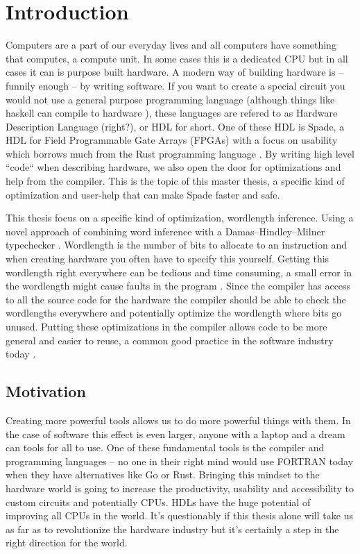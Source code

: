\documentclass[msc,lith,english]{liuthesis}
\author{Edvard Thörnros}
\begin{document}
\chapter{Introduction}
\label{chaIntro}
Computers are a part of our everyday lives and all computers have something that computes, a compute unit. In some cases this is a dedicated CPU but in all cases it can is purpose built hardware. A modern way of building hardware is -- funnily enough -- by writing software. If you want to create a special circuit you would not use a general purpose programming language (although things like haskell can compile to hardware \cite{src:HaskellLib}), these languages are refered to as Hardware Description Language (right?), or HDL for short. One of these HDL is Spade, a HDL for Field Programmable Gate Arrays (FPGAs) with a focus on usability which borrows much from the Rust programming language \cite{src:spadeSomething}. By writing high level ``code`` when describing hardware, we also open the door for optimizations and help from the compiler. This is the topic of this master thesis, a specific kind of optimization and user-help that can make Spade faster and safe.

This thesis focus on a specific kind of optimization, wordlength inference. Using a novel approach of combining word inference with a Damas–Hindley–Milner typechecker \cite{src:SpadeTypes}. Wordlength is the number of bits to allocate to an instruction and when creating hardware you often have to specify this yourself. Getting this wordlength right everywhere can be tedious and time consuming, a small error in the wordlength might cause faults in the program \cite{src:BugsWithWordLength}. %
Since the compiler has access to all the source code for the hardware the compiler should be able to check the wordlengths everywhere and potentially optimize the wordlength where bits go unused. Putting these optimizations in the compiler allows code to be more general and easier to reuse, a common good practice in the software industry today \cite{src:generalCodeIsGood}.

\section{Motivation}
Creating more powerful tools allows us to do more powerful things with them. In the case of software this effect is even larger, anyone with a laptop and a dream can tools for all to use. One of these fundamental tools is the compiler and programming languages -- no one in their right mind would use FORTRAN today when they have alternatives like Go or Rust. Bringing this mindset to the hardware world is going to increase the productivity, usability and accessibility to custom circuits and potentially CPUs. HDLs have the huge potential of improving all CPUs in the world. It's questionably if this thesis alone will take us as far as to revolutionize the hardware industry but it's certainly a step in the right direction for the world.
\end{document}
